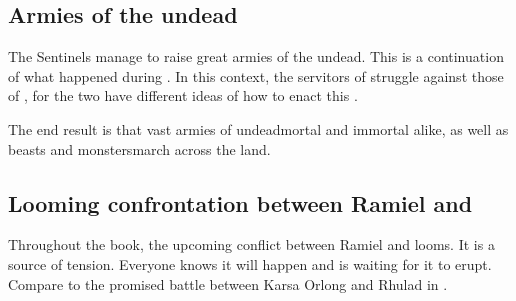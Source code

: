 








\subsection{Armies of the undead}
The Sentinels manage to raise great armies of the undead. 
This is a continuation of what happened during . 
In this context, the servitors of \Thessulax struggle against those of \Secherdamon, for the two have different ideas of how to enact this . 

The end result is that vast armies of undead\dash mortal and immortal alike, as well as beasts and monsters\dash march across the land.









\subsection{Looming confrontation between Ramiel and \Dasteron}
Throughout the book, the upcoming conflict between Ramiel and \Dasteron looms. 
It is a source of tension. 
Everyone knows it will happen and is waiting for it to erupt. 
Compare to the promised battle between Karsa Orlong and Rhulad in \cite{StevenErikson:ReapersGale}. 














